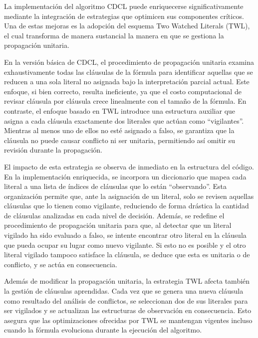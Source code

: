 La implementaci\'on del algoritmo CDCL puede enriquecerse significativamente mediante la integraci\'on de estrategias que optimicen sus componentes cr\'iticos. Una de estas mejoras es la adopci\'on del esquema Two Watched Literals (TWL), el cual transforma de manera sustancial la manera en que se gestiona la propagaci\'on unitaria.

En la versi\'on b\'asica de CDCL, el procedimiento de propagaci\'on unitaria examina exhaustivamente todas las cl\'ausulas de la f\'ormula para identificar aquellas que se reducen a una sola literal no asignada bajo la interpretaci\'on parcial actual. Este enfoque, si bien correcto, resulta ineficiente, ya que el costo computacional de revisar cl\'ausula por cl\'ausula crece linealmente con el tama\~no de la f\'ormula. En contraste, el enfoque basado en TWL introduce una estructura auxiliar que asigna a cada cl\'ausula exactamente dos literales que act\'uan como ``vigilantes''. Mientras al menos uno de ellos no est\'e asignado a falso, se garantiza que la cl\'ausula no puede causar conflicto ni ser unitaria, permitiendo as\'i omitir su revisi\'on durante la propagaci\'on.

El impacto de esta estrategia se observa de inmediato en la estructura del c\'odigo. En la implementaci\'on enriquecida, se incorpora un diccionario que mapea cada literal a una lista de \'indices de cl\'ausulas que lo est\'an ``observando''. Esta organizaci\'on permite que, ante la asignaci\'on de un literal, solo se revisen aquellas cl\'ausulas que lo tienen como vigilante, reduciendo de forma dr\'astica la cantidad de cl\'ausulas analizadas en cada nivel de decisi\'on. Adem\'as, se redefine el procedimiento de propagaci\'on unitaria para que, al detectar que un literal vigilado ha sido evaluado a falso, se intente encontrar otro literal en la cl\'ausula que pueda ocupar su lugar como nuevo vigilante. Si esto no es posible y el otro literal vigilado tampoco satisface la cl\'ausula, se deduce que esta es unitaria o de conflicto, y se act\'ua en consecuencia.

Adem\'as de modificar la propagaci\'on unitaria, la estrategia TWL afecta tambi\'en la gesti\'on de cl\'ausulas aprendidas. Cada vez que se genera una nueva cl\'ausula como resultado del an\'alisis de conflictos, se seleccionan dos de sus literales para ser vigilados y se actualizan las estructuras de observaci\'on en consecuencia. Esto asegura que las optimizaciones ofrecidas por TWL se mantengan vigentes incluso cuando la f\'ormula evoluciona durante la ejecuci\'on del algoritmo.

